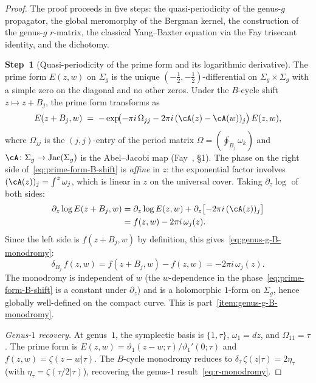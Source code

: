 \begin{proof}
The proof proceeds in five steps: the quasi-periodicity of the
genus-$g$ propagator, the global meromorphy of the Bergman kernel,
the construction of the genus-$g$ $r$-matrix, the classical
Yang--Baxter equation via the Fay trisecant identity, and the
dichotomy.

\medskip
\textbf{Step~1} (Quasi-periodicity of the prime form and its
logarithmic derivative).
The prime form $E(z,w)$ on $\Sigma_g$ is the unique
$(-\tfrac{1}{2}, -\tfrac{1}{2})$-differential on $\Sigma_g \times
\Sigma_g$ with a simple zero on the diagonal and no other zeros.
Under the $B$-cycle shift $z \mapsto z + B_j$, the prime form
transforms as
\begin{equation}
\label{eq:prime-form-B-shift}
E(z + B_j, w)
\;=\;
-\exp\!\bigl(-\pi i\, \Omega_{jj}
 - 2\pi i\, (\cA(z) - \cA(w))_j\bigr)\, E(z,w),
\end{equation}
where $\Omega_{jj}$ is the $(j,j)$-entry of the period matrix
$\Omega = (\oint_{B_j} \omega_k)$ and
$\cA \colon \Sigma_g \to \operatorname{Jac}(\Sigma_g)$ is the
Abel--Jacobi map (Fay~\cite{Fay73}, \S1).
The phase on the right side
of~\eqref{eq:prime-form-B-shift} is \emph{affine} in $z$: the
exponential factor involves $(\cA(z))_j = \int^z \omega_j$,
which is linear in $z$ on the universal cover. Taking
$\partial_z \log$ of both sides:
\begin{align}
\partial_z \log E(z + B_j, w)
&= \partial_z \log E(z,w)
 + \partial_z \bigl[-2\pi i\, (\cA(z))_j\bigr]
 \notag \\
&= f(z,w) - 2\pi i\, \omega_j(z).
\label{eq:f-B-shift-derivation}
\end{align}
Since the left side is $f(z + B_j, w)$ by definition, this
gives~\eqref{eq:genus-g-B-monodromy}:
\[
\delta_{B_j}\, f(z,w)
= f(z + B_j, w) - f(z,w)
= -2\pi i\, \omega_j(z).
\]
The monodromy is independent of $w$ (the $w$-dependence in the
phase~\eqref{eq:prime-form-B-shift} is a constant under
$\partial_z$) and is a holomorphic
$1$-form on $\Sigma_g$, hence globally well-defined on the
compact curve. This is part~\ref{item:genus-g-B-monodromy}.

\emph{Genus-$1$ recovery.}
At genus~$1$, the symplectic basis is $\{1, \tau\}$,
$\omega_1 = dz$, and $\Omega_{11} = \tau$. The prime form is
$E(z,w) = \vartheta_1(z - w;\tau)/\vartheta_1'(0;\tau)$ and
$f(z,w) = \zeta(z - w|\tau)$. The $B$-cycle monodromy reduces to
$\delta_\tau\, \zeta(z|\tau) = 2\eta_\tau$
(with $\eta_\tau = \zeta(\tau/2|\tau)$), recovering the genus-$1$
result~\eqref{eq:r-monodromy}.


\end{proof}
